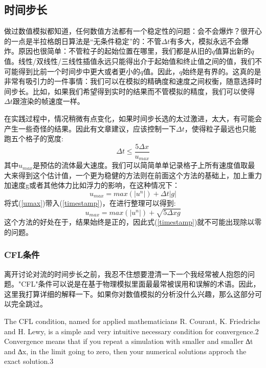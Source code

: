 \documentclass{article}
\begin{document}
\subsection{时间步长}
做过数值模拟都知道，任何数值方法都有一个稳定性的问题：会不会爆炸？很开心的一点是半拉格朗日算法是“无条件稳定”的：不管$\Delta{t}$有多大，模拟永远不会爆炸。原因也很简单：不管粒子的起始位置在哪里，我们都是从旧的$q$值算出新的$q$值。线性/双线性/三线性插值永远只能得出介于起始值和终止值之间的值，我们不可能得到比前一个时间步中更大或者更小的$q$值。因此，$q$始终是有界的。这真的是非常有吸引力的一件事情：我们可以在模拟的精确度和速度之间权衡，随意选择时间步长。比如，如果我们希望得到实时的结果而不管模拟的精度，我们可以使得$\Delta{t}$跟渲染的帧速度一样。
\par
在实践过程中，情况稍微有点变化，如果时间步长选的太过激进，太大，有可能会产生一些奇怪的结果。因此有文章建议，应该控制一下$\Delta{t}$，使得粒子最远也只能跑五个格子的宽度:
\begin{equation}
\Delta{t}\le{\frac{5\Delta{x}}{u_{max}}}  \label{timestamp}
\end{equation}
其中$u_{max}$是预估的流体最大速度。我们可以简简单单记录格子上所有速度值取最大来得到这个估计值，一个更为稳健的方法则在前面这个方法的基础上，加上重力加速度g或者其他体力比如浮力的影响，在这种情况下：
\begin{equation}
u_{max}=max(|u^n|)+\Delta{t}|g|   \label{umax}
\end{equation}
将式(\ref{umax})带入(\ref{timestamp})，在进行整理可以得到:
\begin{equation}
u_{max}=max(|u^n|)+\sqrt{5\Delta{x} g}
\end{equation}
这个方法的好处在于，结果始终是正的，因此式(\ref{timestamp})就不可能出现除以零的问题。
\subsubsection{CFL条件}
离开讨论对流的时间步长之前，我忍不住想要澄清一下一个我经常被人抱怨的问题。"CFL"条件可以说是在基于物理模拟里面最最常被误用和误解的术语。因此，这里我打算详细的解释一下。如果你对数值模拟的分析没什么兴趣，那么这部分可以完全跳过。
\par
The CFL condition, named for applied mathematicians R. Courant, K. Friedrichs and H. Lewy, is a simple and very
intuitive necessary condition for convergence.2 Convergence means that if you repeat a simulation with smaller and
smaller ∆t and ∆x, in the limit going to zero, then your numerical solutions approch the exact solution.3
\end{document}

